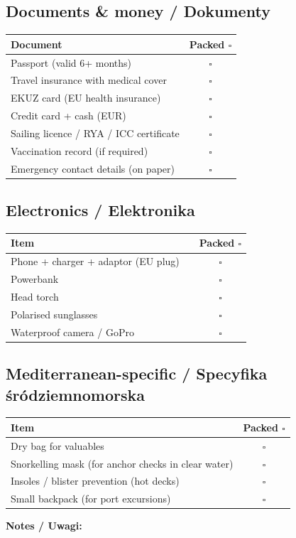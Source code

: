 \documentclass[a4paper,11pt]{article}
\begin{document}
\subsection*{Documents \& money / Dokumenty}
\begin{tabularx}{\linewidth}{|X|c|}
\hline
\textbf{Document} & \textbf{Packed \(\square\)} \\
\hline
Passport (valid 6+ months) & \(\square\) \\[4pt]\hline
Travel insurance with medical cover & \(\square\) \\[4pt]\hline
EKUZ card (EU health insurance) & \(\square\) \\[4pt]\hline
Credit card + cash (EUR) & \(\square\) \\[4pt]\hline
Sailing licence / RYA / ICC certificate & \(\square\) \\[4pt]\hline
Vaccination record (if required) & \(\square\) \\[4pt]\hline
Emergency contact details (on paper) & \(\square\) \\[4pt]\hline
\end{tabularx}

\vspace{0.3cm}

\subsection*{Electronics / Elektronika}
\begin{tabularx}{\linewidth}{|X|c|c|}
\hline
\textbf{Item} & & \textbf{Packed \(\square\)} \\
\hline
Phone + charger + adaptor (EU plug) & & \(\square\) \\[4pt]\hline
Powerbank & & \(\square\) \\[4pt]\hline
Head torch & & \(\square\) \\[4pt]\hline
Polarised sunglasses & & \(\square\) \\[4pt]\hline
Waterproof camera / GoPro & & \(\square\) \\[4pt]\hline
\end{tabularx}

\vspace{0.3cm}

\subsection*{Mediterranean-specific / Specyfika śródziemnomorska}
\begin{tabularx}{\linewidth}{|X|c|}
\hline
\textbf{Item} & \textbf{Packed \(\square\)} \\
\hline
Dry bag for valuables & \(\square\) \\[4pt]\hline
Snorkelling mask (for anchor checks in clear water) & \(\square\) \\[4pt]\hline
Insoles / blister prevention (hot decks) & \(\square\) \\[4pt]\hline
Small backpack (for port excursions) & \(\square\) \\[4pt]\hline
\end{tabularx}

\vspace{0.4cm}
\noindent\textbf{Notes / Uwagi:}
\begin{tabularx}{\linewidth}{|X|}
\hline
\\[2cm]
\hline
\end{tabularx}
\end{document}
